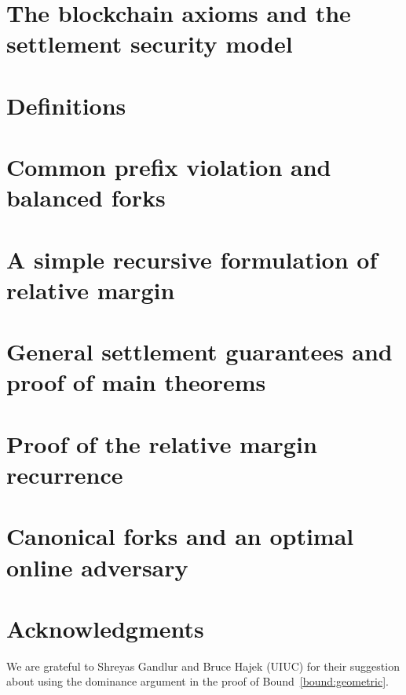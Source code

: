 \documentclass{article}
\theoremstyle{definition}
\begin{document}
\section{The blockchain axioms and the settlement security model}
\label{sec:model}


\section{Definitions}
\label{sec:definitions}


\section{Common prefix violation and balanced forks}
\label{sec:cp-forks}

          
\section{A simple recursive formulation of relative margin}
\label{sec:recursion}


\section{General settlement guarantees and proof of main theorems}
\label{sec:estimates}


\section{Proof of the relative margin recurrence}
\label{sec:margin-proof}


\section{Canonical forks and an optimal online adversary}
\label{sec:canonical-forks}


\section*{Acknowledgments}
We are grateful to Shreyas Gandlur and Bruce Hajek (UIUC) 
for their suggestion about 
using the dominance argument in the proof of Bound~\ref{bound:geometric}. 



\appendix
\end{document}
